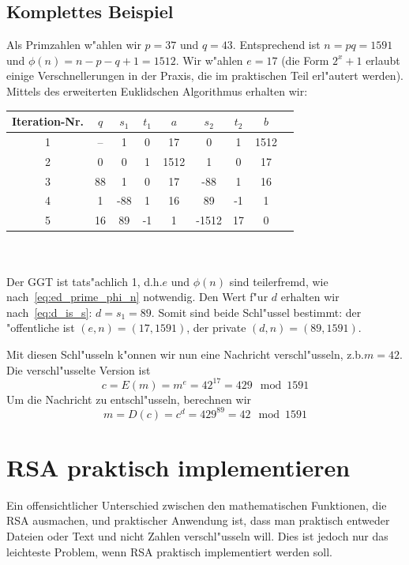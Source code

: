 \documentclass[12pt]{article}
\begin{document}
\subsection{Komplettes Beispiel}
\label{subsec:math:example}

Als Primzahlen w"ahlen wir $p = 37$ und $q = 43$.
Entsprechend ist $n = pq = 1591$ und $\phi(n) = n - p - q + 1 = 1512$.
Wir w"ahlen $e = 17$ (die Form $2^x+1$ erlaubt einige Verschnellerungen in der Praxis, die im praktischen Teil erl"autert werden).
Mittels des erweiterten Euklidschen Algorithmus erhalten wir:\\

\begin{tabular}{c|c c c c c c c l}
    Iteration-Nr. & $q$ & $s_1$ & $t_1$ & $a$ & $s_2$ & $t_2$ & $b$ \\
    \hline
    1 & -- & 1 & 0 & 17 & 0 & 1 & 1512 \\
    2 & 0 & 0 & 1 & 1512 & 1 & 0 & 17 \\
    3 & 88 & 1 & 0 & 17 & -88 & 1 & 16 \\
    4 & 1 & -88 & 1 & 16 & 89 & -1 & 1 \\
    5 & 16 & 89 & -1 & 1 & -1512 & 17 & 0 \\
\end{tabular}
~\\~\\
\noindent
Der GGT ist tats"achlich 1, d.h.\@ $e$ und $\phi(n)$ sind teilerfremd, wie nach~\eqref{eq:ed_prime_phi_n} notwendig.
Den Wert f"ur $d$ erhalten wir nach~\eqref{eq:d_is_s}: $d = s_1 = 89$.
Somit sind beide Schl"ussel be\-stimmt: der "offentliche ist $(e, n) = (17, 1591)$, der private $(d, n) = (89, 1591)$.

Mit diesen Schl"usseln k"onnen wir nun eine Nachricht verschl"usseln, z.b.\@ $m = 42$.
Die verschl"usselte Version ist \[c = E(m) = m^e = 42^{17} = 429 \mod 1591\]
Um die Nachricht zu entschl"usseln, berechnen wir
\[m = D(c) = c^d = 429^{89} = 42 \mod 1591\]

\section{RSA praktisch implementieren}

Ein offensichtlicher Unterschied zwischen den mathematischen Funktionen,
die RSA ausmachen, und praktischer Anwendung ist, dass man praktisch entweder Dateien
oder Text und nicht Zahlen verschl"usseln will.
Dies ist jedoch nur das leichteste Problem, wenn RSA praktisch implementiert werden soll.
\end{document}
